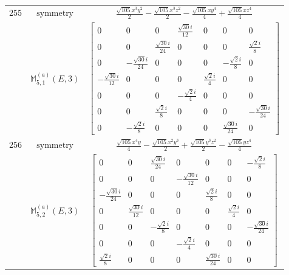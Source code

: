 \documentclass[fleqn,8pt,landscape]{jsarticle}
\begin{document}
\begin{longtable}{ccc}
$ 255 $ & $ \text{symmetry} $ & $ \frac{\sqrt{105} x^{3} y^{2}}{2} - \frac{\sqrt{105} x^{3} z^{2}}{2} - \frac{\sqrt{105} x y^{4}}{4} + \frac{\sqrt{105} x z^{4}}{4} $ \\
$  $ & $ \mathbb{M}_{5,1}^{(a)}(E,3) $ & $ \begin{bmatrix} 0 & 0 & 0 & \frac{\sqrt{30} i}{12} & 0 & 0 & 0 \\ 0 & 0 & \frac{\sqrt{30} i}{24} & 0 & 0 & 0 & \frac{\sqrt{2} i}{8} \\ 0 & - \frac{\sqrt{30} i}{24} & 0 & 0 & 0 & - \frac{\sqrt{2} i}{8} & 0 \\ - \frac{\sqrt{30} i}{12} & 0 & 0 & 0 & \frac{\sqrt{2} i}{4} & 0 & 0 \\ 0 & 0 & 0 & - \frac{\sqrt{2} i}{4} & 0 & 0 & 0 \\ 0 & 0 & \frac{\sqrt{2} i}{8} & 0 & 0 & 0 & - \frac{\sqrt{30} i}{24} \\ 0 & - \frac{\sqrt{2} i}{8} & 0 & 0 & 0 & \frac{\sqrt{30} i}{24} & 0 \end{bmatrix} $ \\ \hline
$ 256 $ & $ \text{symmetry} $ & $ \frac{\sqrt{105} x^{4} y}{4} - \frac{\sqrt{105} x^{2} y^{3}}{2} + \frac{\sqrt{105} y^{3} z^{2}}{2} - \frac{\sqrt{105} y z^{4}}{4} $ \\
$  $ & $ \mathbb{M}_{5,2}^{(a)}(E,3) $ & $ \begin{bmatrix} 0 & 0 & \frac{\sqrt{30} i}{24} & 0 & 0 & 0 & - \frac{\sqrt{2} i}{8} \\ 0 & 0 & 0 & - \frac{\sqrt{30} i}{12} & 0 & 0 & 0 \\ - \frac{\sqrt{30} i}{24} & 0 & 0 & 0 & \frac{\sqrt{2} i}{8} & 0 & 0 \\ 0 & \frac{\sqrt{30} i}{12} & 0 & 0 & 0 & \frac{\sqrt{2} i}{4} & 0 \\ 0 & 0 & - \frac{\sqrt{2} i}{8} & 0 & 0 & 0 & - \frac{\sqrt{30} i}{24} \\ 0 & 0 & 0 & - \frac{\sqrt{2} i}{4} & 0 & 0 & 0 \\ \frac{\sqrt{2} i}{8} & 0 & 0 & 0 & \frac{\sqrt{30} i}{24} & 0 & 0 \end{bmatrix} $ \\ \hline
\end{longtable}
\end{document}
